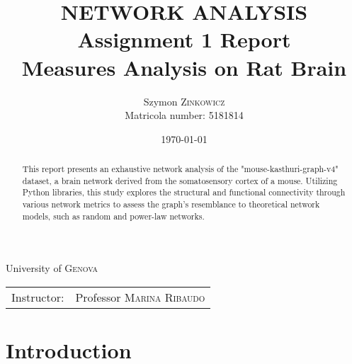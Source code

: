 \documentclass[
	report, %
	11pt, %
]{CSUniSchoolLabReport}
\title{NETWORK ANALYSIS \\
\large Assignment 1 Report \\
		Measures Analysis on Rat Brain} %
\author{Szymon \textsc{Zinkowicz} \\ Matricola number: 5181814} %
\date{\today} %
\begin{document}
\maketitle %
\thispagestyle{empty}

\begin{center}
	\vspace{\fill}
	University of \textsc{Genova} \\
	\begin{tabular}{l r}
		Instructor: & Professor \textsc{Marina Ribaudo}
	\end{tabular}
\end{center}
\pagebreak



\begin{abstract}
	\thispagestyle{empty}
	This report presents an exhaustive network analysis of the "mouse-kasthuri-graph-v4" dataset, a brain network derived from the somatosensory cortex of a mouse. Utilizing Python libraries, this study explores the structural and functional connectivity through various network metrics to assess the graph's resemblance to theoretical network models, such as random and power-law networks.\\
	
\end{abstract}
\pagebreak

\tableofcontents %
\thispagestyle{empty}
\pagebreak

\section{Introduction}
\end{document}
